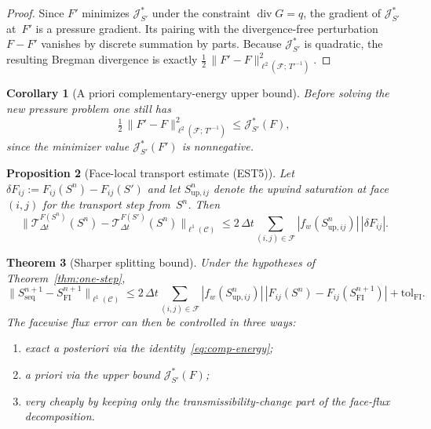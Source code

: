 \documentclass[11pt]{article}
\newtheorem{theorem}{Theorem}[section]
\newtheorem{proposition}[theorem]{Proposition}
\newtheorem{corollary}[theorem]{Corollary}
\begin{document}
\begin{proof}
Since $F'$ minimizes $\mathcal{J}^*_{S'}$ under the constraint
$\operatorname{div} G = q$, the gradient of $\mathcal{J}^*_{S'}$ at~$F'$ is
a pressure gradient.  Its pairing with the divergence-free perturbation
$F - F'$ vanishes by discrete summation by parts.  Because
$\mathcal{J}^*_{S'}$ is quadratic, the resulting Bregman divergence is
exactly
$\tfrac{1}{2}\,\|F'-F\|^2_{\ell^2(\mathcal{F};\,T'^{-1})}$.
\end{proof}

\begin{corollary}[A priori complementary-energy upper bound]
\label{cor:apriori}
Before solving the new pressure problem one still has
\[
  \tfrac{1}{2}\,\|F' - F\|^2_{\ell^2(\mathcal{F};\,T'^{-1})}
    \le \mathcal{J}^*_{S'}(F),
\]
since the minimizer value $\mathcal{J}^*_{S'}(F')$ is nonnegative.
\end{corollary}

\begin{proposition}[Face-local transport estimate (EST5)]
\label{prop:face-local}
Let $\delta F_{ij} := F_{ij}(S^n) - F_{ij}(S')$ and let $S^n_{\mathrm{up},ij}$
denote the upwind saturation at face~$(i,j)$ for the transport step
from~$S^n$.  Then
\begin{equation}\label{eq:face-local}
  \bigl\|\mathcal{T}^{F(S^n)}_{\Delta t}(S^n)
    - \mathcal{T}^{F(S')}_{\Delta t}(S^n)
  \bigr\|_{\ell^1(\mathcal{C})}
    \le 2\,\Delta t
        \sum_{(i,j)\in\mathcal{F}}
          |f_w(S^n_{\mathrm{up},ij})|\,|\delta F_{ij}|.
\end{equation}
\end{proposition}

\begin{theorem}[Sharper splitting bound]\label{thm:sharp}
Under the hypotheses of Theorem~\ref{thm:one-step},
\begin{equation}\label{eq:sharp}
  \|S^{n+1}_{\mathrm{seq}} - S^{n+1}_{\mathrm{FI}}\|_{\ell^1(\mathcal{C})}
    \le 2\,\Delta t
        \sum_{(i,j)\in\mathcal{F}}
          |f_w(S^n_{\mathrm{up},ij})|\,
          |F_{ij}(S^n) - F_{ij}(S^{n+1}_{\mathrm{FI}})|
      + \mathrm{tol}_{\mathrm{FI}}.
\end{equation}
The facewise flux error can then be controlled in three ways:
\begin{enumerate}
\item exact a posteriori via the identity~\eqref{eq:comp-energy};
\item a priori via the upper bound $\mathcal{J}^*_{S'}(F)$;
\item very cheaply by keeping only the transmissibility-change part of the
      face-flux decomposition.
\end{enumerate}
\end{theorem}
\end{document}
